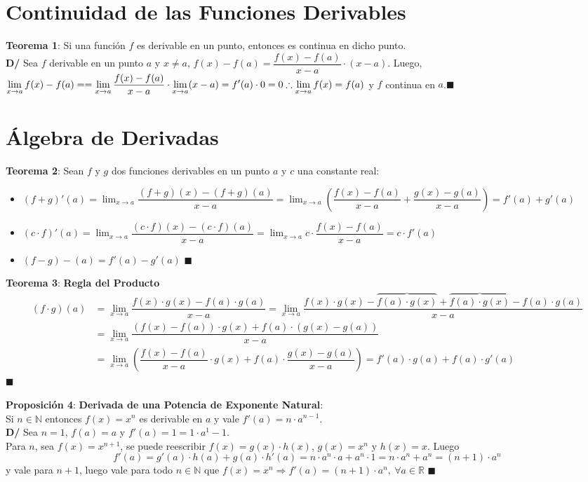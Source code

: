 \documentclass[11pt,a4paper]{article}
\newcommand*{\QEDA}{\null\nobreak\hfill\ensuremath{\blacksquare}}
\begin{document}
\section{Continuidad de las Funciones Derivables}
\noindent \textbf{Teorema 1}: Si una funci\'on $f$ es derivable en un punto, entonces es continua en dicho punto.\\
\textbf{D/} Sea $f$ derivable en un punto $a$ y $x\not=a$, $f(x)-f(a)=\dfrac{f(x)-f(a)}{x-a}\cdot(x-a)$. Luego, $\displaystyle{\lim_{x \to a} f(x)-f(a) =} \\ \displaystyle{= \lim_{x \to a} \dfrac{f(x)-f(a)}{x-a} \cdot \lim_{x \to a} (x-a)} = f'(a)\cdot 0 = 0 \therefore \displaystyle{\lim_{x \to a} f(x) = f(a)}$ y $f$ continua en $a$.\QEDA

\section{\'Algebra de Derivadas}
\textbf{Teorema 2}: Sean $f$ y $g$ dos funciones derivables en un punto $a$ y $c$ una constante real:
\begin{itemize}
\item $(f+g)'(a) = \displaystyle{\lim_{x \to a} \dfrac{(f+g)(x)-(f+g)(a)}{x-a} = \lim_{x \to a} \left( \dfrac{f(x)-f(a)}{x-a} + \dfrac{g(x)-g(a)}{x-a} \right)} = f'(a) + g'(a)$
\item $(c\cdot f)'(a) = \displaystyle{\lim_{x \to a} \dfrac{(c\cdot f)(x) - (c\cdot f)(a)}{x-a} = \lim_{x \to a} c \cdot \dfrac{f(x) - f(a)}{x-a}} = c\cdot f'(a)$
\item $(f-g)-(a) = f'(a) - g'(a)$
\QEDA
\end{itemize}

\noindent \textbf{Teorema 3}: \textbf{Regla del Producto}
\begin{align*}
(f\cdot g)(a)
& = \displaystyle{\lim_{x \to a} \dfrac{f(x) \cdot g(x) - f(a) \cdot g(a)}{x-a}} 
  = \displaystyle{\lim_{x \to a} \dfrac{f(x) \cdot g(x) - \overbrace{f(a) \cdot g(x)} + \overbrace{f(a) \cdot g(x)} - f(a) \cdot g(a)}{x-a}} \\
& = \displaystyle{\lim_{x \to a} \dfrac{(f(x) - f(a)) \cdot g(x) + f(a) \cdot (g(x) - g(a))}{x-a}}\\
& = \displaystyle{\lim_{x \to a} \left(\dfrac{f(x) - f(a)}{x-a} \cdot g(x) + f(a) \cdot \dfrac{g(x) - g(a)}{x-a}\right)}
  = f'(a) \cdot g(a) + f(a) \cdot g'(a)
\end{align*}
\QEDA

\noindent \textbf{Proposici\'on 4}: \textbf{Derivada de una Potencia de Exponente Natural}:\\
Si $n \in \mathbb{N}$ entonces $f(x)=x^n$ es derivable en $a$ y vale $f'(a)=n\cdot a^{n-1}$.\\
\textbf{D/} Sea $n=1$, $f(a)=a$ y $f'(a) = 1 = 1 \cdot a^1-1$.\\ Para $n$, sea $f(x)=x^{n+1}$, se puede reescribir $f(x) = g(x) \cdot h(x)$, $g(x) = x^n$ y $h(x) = x$. Luego $$f'(a) = g'(a)\cdot h(a) + g(a) \cdot h'(a) = n\cdot a^n \cdot a + a^n \cdot 1 = n \cdot a^n + a^n = (n+1)\cdot a^n$$ y vale para $n+1$, luego vale para todo $n \in \mathbb{N}$ que $f(x)=x^n \Rightarrow f'(a) = (n+1)\cdot a^n,\ \forall a \in \mathbb{R}$ \QEDA\\
\end{document}
